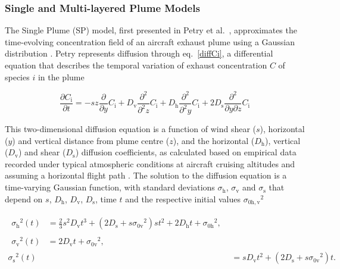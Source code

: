 \subsubsection{Single and Multi-layered Plume Models}
The Single Plume (SP) model, first presented in Petry et al.\ \cite{Petry1998}, approximates the time-evolving concentration field of an aircraft exhaust plume using a Gaussian distribution \cite{Vohralik2008}. Petry represents diffusion through eq.\ \eqref{diffCi}, a differential equation that describes the temporal variation of exhaust concentration $C$ of species $i$ in the plume

\begin{equation}
	\frac{\partial C_{\mathrm{i}}}{\partial t} = -sz \frac{\partial}{\partial y} C_{\mathrm{i}} + D_{\mathrm{v}} \frac{\partial^2}{\partial^2 z} C_{\mathrm{i}} + D_{\mathrm{h}} \frac{\partial^2}{\partial^2 y} C_{\mathrm{i}} + 2D_{\mathrm{s}} \frac{\partial^2}{\partial y \partial z} C_{\mathrm{i}}
	\label{diffCi}
\end{equation}

This two-dimensional diffusion equation is a function of wind shear ($s$), horizontal ($y$) and vertical distance from plume centre ($z$), and the horizontal ($D_{\mathrm{h}}$), vertical ($D_{\mathrm{v}}$) and shear ($D_{\mathrm{s}}$) diffusion coefficients, as calculated based on empirical data recorded under typical atmospheric conditions at aircraft cruising altitudes and assuming a horizontal flight path \cite{Durbeck1995}. The solution to the diffusion equation is a time-varying Gaussian function, with standard deviations $\sigma_{\mathrm{h}}$, $\sigma_{\mathrm{v}}$ and $\sigma_{\mathrm{s}}$ that depend on $s$, $D_{\mathrm{h}}$, $D_{\mathrm{v}}$, $D_{\mathrm{s}}$, time $t$ and the respective initial values ${\sigma_{\mathrm{0h, v}}}^2$


\begin{align}
\begin{split}
	{\sigma_{\mathrm{h}}}^{2}(t) {}&= \frac{2}{3} s^2 D_{\mathrm{v}} t^3 + (2 D_{\mathrm{s}} + s {\sigma_{\mathrm{0v}}}^2) s t^2 + 2 D_{\mathrm{h}} t + {\sigma_{\mathrm{0h}}}^2,
\end{split} \\
\begin{split}
	{\sigma_{\mathrm{v}}}^{2}(t) {}&= 2 D_{\mathrm{v}} t + {\sigma_{\mathrm{0v}}}^2,
	\end{split}\\
	{\sigma_{\mathrm{s}}}^{2}(t) {}&= s D_{\mathrm{v}} t^2 + (2 D_{\mathrm{s}} + s {\sigma_{\mathrm{0v}}}^2) t.
\end{align}

